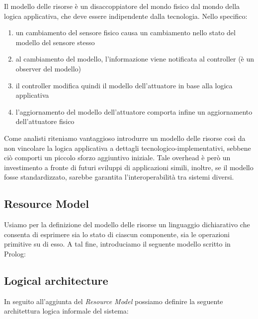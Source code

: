 \documentclass{../llncs}
\begin{document}
Il modello delle risorse è un disaccoppiatore del mondo fisico dal mondo della logica applicativa, che deve essere indipendente dalla tecnologia. Nello specifico:
\begin{enumerate}
\item un cambiamento del sensore fisico causa un cambiamento nello stato del modello del sensore stesso
\item al cambiamento del modello, l'informazione viene notificata al controller (è un observer del modello)
\item il controller modifica quindi il modello dell'attuatore in base alla logica applicativa
\item l'aggiornamento del modello dell'attuatore comporta infine un aggiornamento dell'attuatore fisico
\end{enumerate}

Come analisti riteniamo vantaggioso introdurre un modello delle risorse così da non vincolare la logica applicativa a dettagli tecnologico-implementativi, sebbene ciò comporti un piccolo sforzo aggiuntivo iniziale. Tale overhead è però un investimento a fronte di futuri sviluppi di applicazioni simili, inoltre, se il modello fosse standardizzato, sarebbe garantita l'interoperabilità tra sistemi diversi.

\subsection{Resource Model}
Usiamo per la definizione del modello delle risorse un linguaggio dichiarativo che consenta di esprimere sia lo stato di ciascun componente, sia le operazioni primitive su di esso. A tal fine, introduciamo il seguente modello scritto in Prolog:\\



\subsection{Logical architecture}

In seguito all'aggiunta del \emph{Resource Model} possiamo definire la seguente architettura logica informale del sistema:
\end{document}
